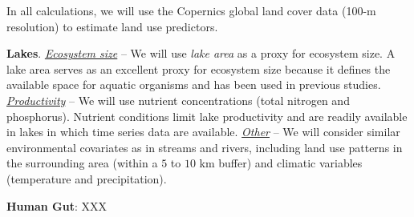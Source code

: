 \documentclass[12pt, class=article, crop=false]{standalone}
\begin{document}
In all calculations, we will use the Copernics global land cover data (100-m resolution) to estimate land use predictors.

\textbf{Lakes}.
\ul{\textit{Ecosystem size}} --
We will use \textit{lake area} as a proxy for ecosystem size.
A lake area serves as an excellent proxy for ecosystem size because it defines the available space for aquatic organisms and has been used in previous studies.
\ul{\textit{Productivity}} -- 
We will use nutrient concentrations (total nitrogen and phosphorus).  
Nutrient conditions limit lake productivity and are readily available in lakes in which time series data are available.
\ul{\textit{Other}} -- We will consider similar environmental covariates as in streams and rivers, including land use patterns in the surrounding area (within a $5$ to $10$ km buffer) and climatic variables (temperature and precipitation).

\textbf{Human Gut}: XXX

\newpage


\end{document}
